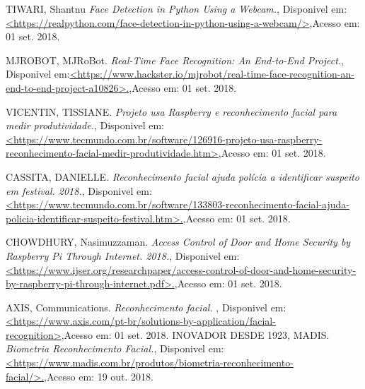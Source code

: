 \documentclass[conference,compsoc]{IEEEtran}
\begin{document}
\begin{thebibliography}{1}




{TIWARI, Shantnu
\emph{Face Detection in Python Using a Webcam.},
 {Disponivel em:\url{<https://realpython.com/face-detection-in-python-using-a-webcam/>}},{Acesso em: 01 set. 2018.}
}

{MJROBOT, MJRoBot.
\emph{Real-Time Face Recognition: An End-to-End Project.},
 {Disponivel em:\url{<https://www.hackster.io/mjrobot/real-time-face-recognition-an-end-to-end-project-a10826>.}},{Acesso em: 01 set. 2018.}
}

{VICENTIN, TISSIANE.
\emph{Projeto usa Raspberry e reconhecimento facial para medir produtividade.},
 {Disponivel em:\url{<https://www.tecmundo.com.br/software/126916-projeto-usa-raspberry-reconhecimento-facial-medir-produtividade.htm>}},{Acesso em: 01 set. 2018.}
}

{CASSITA, DANIELLE.
\emph{Reconhecimento facial ajuda polícia a identificar suspeito em festival. 2018.},
 {Disponivel em:\url{<https://www.tecmundo.com.br/software/133803-reconhecimento-facial-ajuda-policia-identificar-suspeito-festival.htm>.}},{Acesso em: 01 set. 2018.}
}

{CHOWDHURY, Nasimuzzaman.
\emph{Access Control of Door and Home Security by Raspberry Pi Through Internet. 2018.},
 {Disponivel em:\url{<https://www.ijser.org/researchpaper/access-control-of-door-and-home-security-by-raspberry-pi-through-internet.pdf>.}},{Acesso em: 01 set. 2018.}
}

{AXIS, Communications.
\emph{Reconhecimento facial. },
 {Disponivel em:\url{<https://www.axis.com/pt-br/solutions-by-application/facial-recognition>}},{Acesso em: 01 set. 2018.}
}
{INOVADOR DESDE 1923, MADIS.
\emph{Biometria Reconhecimento Facial.},
 {Disponivel em:\url{<https://www.madis.com.br/produtos/biometria-reconhecimento-facial/>.}},{Acesso em: 19 out. 2018.}
}


\end{thebibliography}




\end{document}
